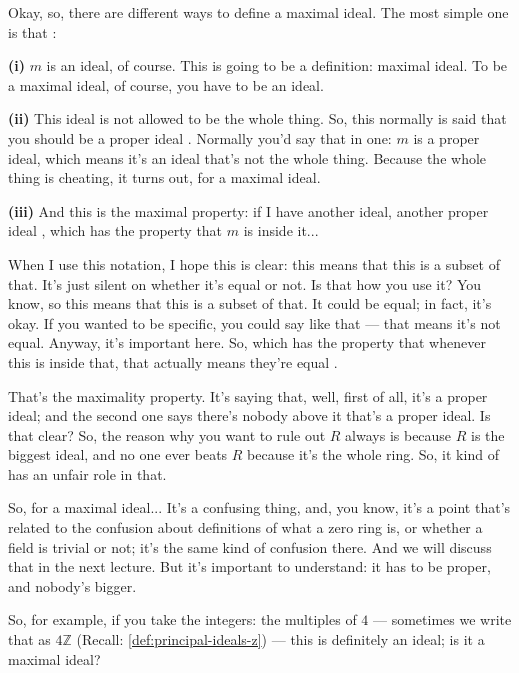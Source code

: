 \begin{speech}[00:37:56 - 00:40:01]
Okay, so, there are different ways to define a maximal ideal. The most simple one is that :

\textbf{(i)} $m$ is an ideal, of course.  This is going to be a definition: maximal ideal. To be a maximal ideal, of course, you have to be an ideal.

\textbf{(ii)} This ideal is not allowed to be the whole thing. So, this normally is said that you should be a proper ideal . Normally you'd say that in one: $m$ is a proper ideal, which means it's an ideal that's not the whole thing. Because the whole thing is cheating, it turns out, for a maximal ideal.

\textbf{(iii)} And this is the maximal property: if I have another ideal, another proper ideal , which has the property that $m$ is inside it... 

When I use this notation, I hope this is clear: this means that this is a subset of that. It's just silent on whether it's equal or not. Is that how you use it? You know, so this means that this is a subset of that. It could be equal; in fact, it's okay. If you wanted to be specific, you could say like that --- that means it's not equal. Anyway, it's important here. So, which has the property that whenever this is inside that, that actually means they're equal .

That's the maximality property. It's saying that, well, first of all, it's a proper ideal; and the second one says there's nobody above it that's a proper ideal. Is that clear? So, the reason why you want to rule out $R$ always is because $R$ is the biggest ideal, and no one ever beats $R$ because it's the whole ring. So, it kind of has an unfair role in that.
\end{speech}

\begin{speech}[00:40:01 - 00:40:55]
So, for a maximal ideal... It's a confusing thing, and, you know, it's a point that's related to the confusion about definitions of what a zero ring is, or whether a field is trivial or not; it's the same kind of confusion there. And we will discuss that in the next lecture. But it's important to understand: it has to be proper, and nobody's bigger.

So, for example, if you take the integers: the multiples of $4$ --- sometimes we write that as $4\mathbb{Z}$ (Recall: \cref{def:principal-ideals-z}) --- this is definitely an ideal; is it a maximal ideal? 
\end{speech}

